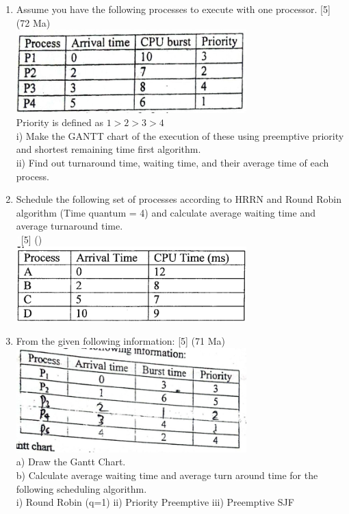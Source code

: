 \documentclass[12pt]{article}
\newcommand{\enter}{\\\textcolor{white}{1}}
\begin{document}
\begin{enumerate}
			\item Assume you have the following processes to execute with one processor. \hfill [5] (72 Ma)\\
			\includegraphics[width=3.5in]{./pics/os_16}\\
			Priority is defined as \( 1 > 2 > 3 > 4 \)\\
			i) Make the GANTT chart of the execution of these using preemptive priority and shortest remaining time first algorithm.\\
			ii) Find out turnaround time, waiting time, and their average time of each process.
			
			\item Schedule the following set of processes according to HRRN and Round Robin algorithm (Time quantum = 4) and calculate average waiting time and average turnaround time. 
			\enter\hfill [5] ()\\
			\includegraphics[width=3.5in]{./pics/os_17}
			
			\item From the given following information: \hfill [5] (71 Ma)\\
			\includegraphics[width=3.5in]{./pics/os_18}\\
			a) Draw the Gantt Chart.\\
			b) Calculate average waiting time and average turn around time for the following scheduling algorithm.\\
			i) Round Robin (q=1) \hspace{1cm} ii) Priority Preemptive \hspace{1cm} iii) Preemptive SJF
			

\end{enumerate}
\end{document}
